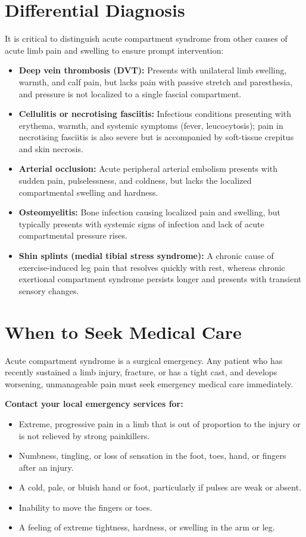 \section*{Differential Diagnosis}
It is critical to distinguish acute compartment syndrome from other causes of acute limb pain and swelling to ensure prompt intervention:
\begin{itemize}
    \item \textbf{Deep vein thrombosis (DVT):} Presents with unilateral limb swelling, warmth, and calf pain, but lacks pain with passive stretch and paresthesia, and pressure is not localized to a single fascial compartment.
    \item \textbf{Cellulitis or necrotising fasciitis:} Infectious conditions presenting with erythema, warmth, and systemic symptoms (fever, leucocytosis); pain in necrotising fasciitis is also severe but is accompanied by soft-tissue crepitus and skin necrosis.
    \item \textbf{Arterial occlusion:} Acute peripheral arterial embolism presents with sudden pain, pulselessness, and coldness, but lacks the localized compartmental swelling and hardness.
    \item \textbf{Osteomyelitis:} Bone infection causing localized pain and swelling, but typically presents with systemic signs of infection and lack of acute compartmental pressure rises.
    \item \textbf{Shin splints (medial tibial stress syndrome):} A chronic cause of exercise-induced leg pain that resolves quickly with rest, whereas chronic exertional compartment syndrome persists longer and presents with transient sensory changes.
\end{itemize}

\section*{When to Seek Medical Care}
Acute compartment syndrome is a surgical emergency. Any patient who has recently sustained a limb injury, fracture, or has a tight cast, and develops worsening, unmanageable pain must seek emergency medical care immediately.

\textbf{Contact your local emergency services for:}
\begin{itemize}
    \item Extreme, progressive pain in a limb that is out of proportion to the injury or is not relieved by strong painkillers.
    \item Numbness, tingling, or loss of sensation in the foot, toes, hand, or fingers after an injury.
    \item A cold, pale, or bluish hand or foot, particularly if pulses are weak or absent.
    \item Inability to move the fingers or toes.
    \item A feeling of extreme tightness, hardness, or swelling in the arm or leg.
\end{itemize}

